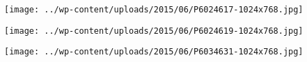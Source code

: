  

 

\begin{center} \texttt{[image: ../wp-content/uploads/2015/06/P6024617-1024x768.jpg]} \end{center}

 

 

\begin{center} \texttt{[image: ../wp-content/uploads/2015/06/P6024619-1024x768.jpg]} \end{center}

 

 

\begin{center} \texttt{[image: ../wp-content/uploads/2015/06/P6034631-1024x768.jpg]} \end{center}




 
 
